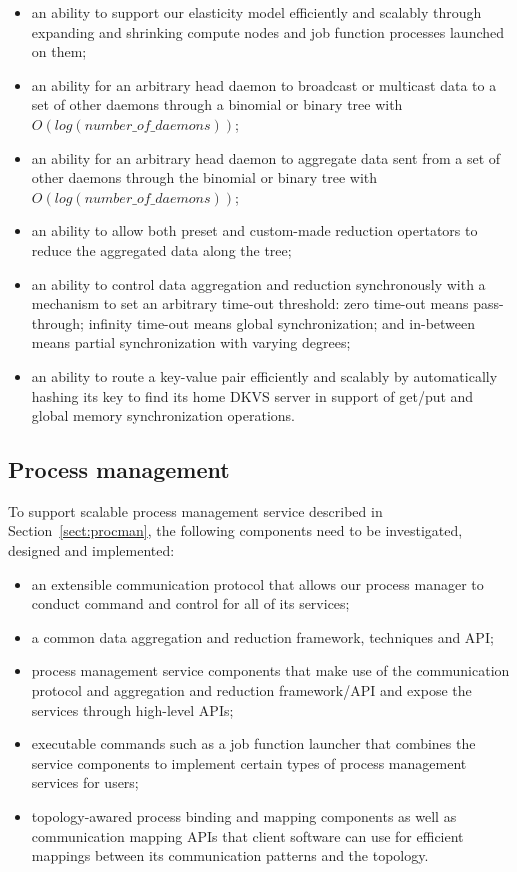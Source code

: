 \documentclass[10pt]{article}
\begin{document}
\begin{itemize}

\item{an ability to support our elasticity model 
efficiently and scalably through expanding and shrinking 
compute nodes and job function processes launched on them;}

\item{an ability for an arbitrary head daemon to broadcast 
or multicast data to a set of other daemons through a binomial 
or binary tree with $O(log(number\_of\_daemons))$;}

\item{an ability for an arbitrary head daemon to aggregate data 
sent from a set of other daemons through the binomial 
or binary tree with $O(log(number\_of\_daemons))$;}

\item{an ability to allow both preset and custom-made reduction 
opertators to reduce the aggregated data along the tree;}

\item{an ability to control data aggregation and reduction synchronously 
with a mechanism to set an arbitrary time-out threshold: zero time-out means pass-through; 
infinity time-out means global synchronization; and
in-between means partial synchronization with varying degrees;}

\item{an ability to route a key-value pair efficiently and
scalably by automatically hashing its key to find its home DKVS server
in support of get/put and global memory synchronization operations.}

\end{itemize}

\subsection{Process management}
To support scalable process management service described in Section~\ref{sect:procman},
the following components need to be investigated, designed and implemented: 
\begin{itemize}
\item{an extensible communication protocol that allows 
our process manager to conduct command and control 
for all of its services;}
\item{a common data aggregation and reduction framework, techniques and API;} 
\item{process management service components that 
make use of the communication protocol and aggregation and reduction framework/API
and expose the services through high-level APIs;}
\item{executable commands such as a job function launcher that combines the 
service components to implement certain types of process management 
services for users;} 
\item{topology-awared process binding and mapping components as well as
communication mapping APIs that client software can use for efficient 
mappings between its communication patterns and the topology.}
\end{itemize}
\end{document}
